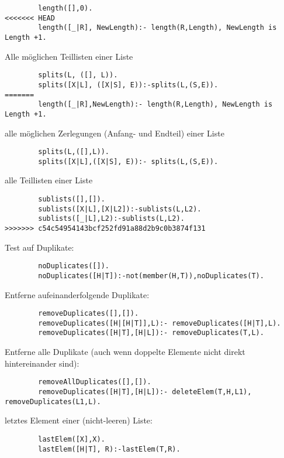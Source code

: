 \begin{compactitem}
		\begin{lstlisting}
		length([],0).
<<<<<<< HEAD
		length([_|R], NewLength):- length(R,Length), NewLength is Length +1.
		\end{lstlisting}	
	\item Alle möglichen Teillisten einer Liste 
		\begin{lstlisting}
		splits(L, ([], L)).
		splits([X|L], ([X|S], E)):-splits(L,(S,E)).
=======
		length([_|R],NewLength):- length(R,Length), NewLength is Length +1.
		\end{lstlisting}	
	\item alle möglichen Zerlegungen (Anfang- und Endteil) einer Liste 
		\begin{lstlisting}
		splits(L,([],L)).
		splits([X|L],([X|S], E)):- splits(L,(S,E)).
		\end{lstlisting}	
	\item alle Teillisten einer Liste
		\begin{lstlisting}
		sublists([],[]).
		sublists([X|L],[X|L2]):-sublists(L,L2).
		sublists([_|L],L2):-sublists(L,L2).
>>>>>>> c54c54954143bcf252fd91a88d2b9c0b3874f131
		\end{lstlisting}
	\item Test auf Duplikate:
		\begin{lstlisting}
		noDuplicates([]).
		noDuplicates([H|T]):-not(member(H,T)),noDuplicates(T).
		\end{lstlisting}
	\item Entferne aufeinanderfolgende Duplikate:
		\begin{lstlisting}
		removeDuplicates([],[]).
		removeDuplicates([H|[H|T]],L):- removeDuplicates([H|T],L).
		removeDuplicates([H|T],[H|L]):- removeDuplicates(T,L).
		\end{lstlisting}
	\item Entferne alle Duplikate (auch wenn doppelte Elemente nicht direkt hintereinander sind):
		\begin{lstlisting}
		removeAllDuplicates([],[]).
		removeDuplicates([H|T],[H|L]):- deleteElem(T,H,L1), removeDuplicates(L1,L).
		\end{lstlisting}
	\item letztes Element einer (nicht-leeren) Liste:
		\begin{lstlisting}
		lastElem([X],X).
		lastElem([H|T], R):-lastElem(T,R).
		\end{lstlisting}
\end{compactitem}

